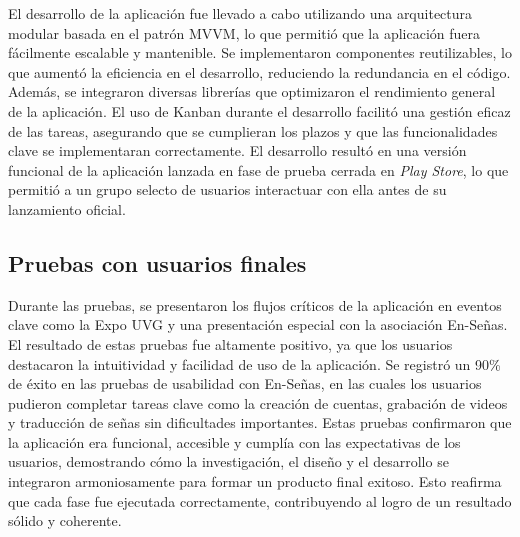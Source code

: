 El desarrollo de la aplicación fue llevado a cabo utilizando una arquitectura modular basada en el patrón MVVM, lo que permitió que la aplicación fuera fácilmente escalable y mantenible. Se implementaron componentes reutilizables, lo que aumentó la eficiencia en el desarrollo, reduciendo la redundancia en el código. Además, se integraron diversas librerías que optimizaron el rendimiento general de la aplicación. El uso de Kanban durante el desarrollo facilitó una gestión eficaz de las tareas, asegurando que se cumplieran los plazos y que las funcionalidades clave se implementaran correctamente. El desarrollo resultó en una versión funcional de la aplicación lanzada en fase de prueba cerrada en \textit{Play Store}, lo que permitió a un grupo selecto de usuarios interactuar con ella antes de su lanzamiento oficial. 


\subsection{Pruebas con usuarios finales}

Durante las pruebas, se presentaron los flujos críticos de la aplicación en eventos clave como la Expo UVG y una presentación especial con la asociación En-Señas. El resultado de estas pruebas fue altamente positivo, ya que los usuarios destacaron la intuitividad y facilidad de uso de la aplicación. Se registró un 90\% de éxito en las pruebas de usabilidad con En-Señas, en las cuales los usuarios pudieron completar tareas clave como la creación de cuentas, grabación de videos y traducción de señas sin dificultades importantes. Estas pruebas confirmaron que la aplicación era funcional, accesible y cumplía con las expectativas de los usuarios, demostrando cómo la investigación, el diseño y el desarrollo se integraron armoniosamente para formar un producto final exitoso. Esto reafirma que cada fase fue ejecutada correctamente, contribuyendo al logro de un resultado sólido y coherente.